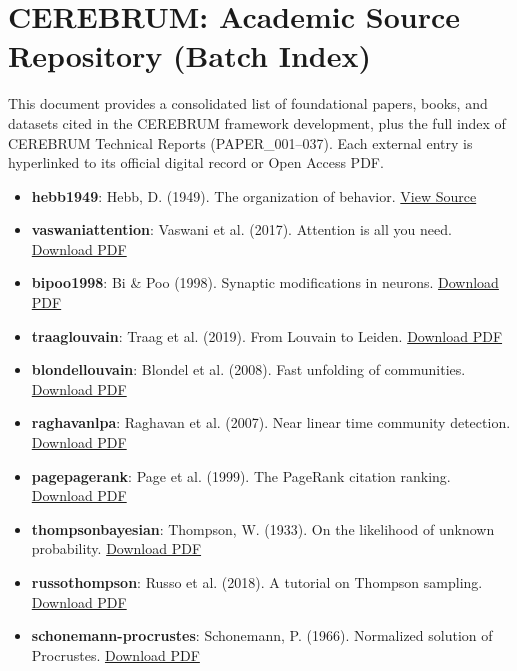 \section{CEREBRUM: Academic Source Repository (Batch Index)}

This document provides a conso\-lidated list of found\-ational papers, books, and datasets cited in the CEREBRUM framework development, plus the full index of CEREBRUM Technical Reports (PAPER\_001–037). Each external entry is hyperlinked to its official digital record or Open Access PDF.

\begin{itemize}
\item \textbf{hebb1949}: Hebb, D. (1949). The organ\-ization of behavior. \href{https://archive.org/details/organizationofbe00hebb}{View Source}
\item \textbf{vaswani\-attention}: Vaswani et al. (2017). Attention is all you need. \href{https://arxiv.org/pdf/1706.03762.pdf}{Download PDF}
\item \textbf{bipoo1998}: Bi \& Poo (1998). Synaptic modif\-ications in neurons. \href{https://www.jneurosci.org/content/jneuro/18/24/10464.full.pdf}{Download PDF}
\item \textbf{traag\-louvain}: Traag et al. (2019). From Louvain to Leiden. \href{https://arxiv.org/pdf/1810.08473.pdf}{Download PDF}
\item \textbf{blondel\-louvain}: Blondel et al. (2008). Fast unfolding of communities. \href{https://arxiv.org/pdf/0803.0476.pdf}{Download PDF}
\item \textbf{raghavan\-lpa}: Raghavan et al. (2007). Near linear time community detection. \href{https://arxiv.org/pdf/0709.2931.pdf}{Download PDF}
\item \textbf{page\-pagerank}: Page et al. (1999). The PageRank citation ranking. \href{http://ilpubs.stanford.edu:8090/422/1/1999-66.pdf}{Download PDF}
\item \textbf{thompson\-bayesian}: Thompson, W. (1933). On the likelihood of unknown probability. \href{https://www.gwern.net/docs/statistics/bayes/1933-thompson.pdf}{Download PDF}
\item \textbf{russo\-thompson}: Russo et al. (2018). A tutorial on Thompson sampling. \href{https://web.stanford.edu/~bvr/pubs/TS_Tutorial.pdf}{Download PDF}
\item \textbf{schon\-emann\--procrustes}: Schonemann, P. (1966). Normalized solution of Procrustes. \href{https://psychometrika.org/index.php/psychometrika/article/download/10.1007/BF02289451/1056}{Download PDF}

\end{itemize}
